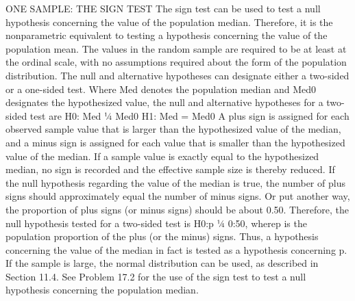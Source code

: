 ONE SAMPLE: THE SIGN TEST
The sign test can be used to test a null hypothesis concerning the value of the population median. Therefore,
it is the nonparametric equivalent to testing a hypothesis concerning the value of the population mean. The
values in the random sample are required to be at least at the ordinal scale, with no assumptions required about
the form of the population distribution.
The null and alternative hypotheses can designate either a two-sided or a one-sided test. Where Med
denotes the population median and Med0 designates the hypothesized value, the null and alternative hypotheses
for a two-sided test are
H0: Med ¼ Med0
H1: Med = Med0
A plus sign is assigned for each observed sample value that is larger than the hypothesized value of the
median, and a minus sign is assigned for each value that is smaller than the hypothesized value of the median. If
a sample value is exactly equal to the hypothesized median, no sign is recorded and the effective sample size is
thereby reduced. If the null hypothesis regarding the value of the median is true, the number of plus signs should
approximately equal the number of minus signs. Or put another way, the proportion of plus signs (or minus
signs) should be about 0.50. Therefore, the null hypothesis tested for a two-sided test is H0:p ¼ 0:50, wherep is
the population proportion of the plus (or the minus) signs. Thus, a hypothesis concerning the value of the
median in fact is tested as a hypothesis concerning p. If the sample is large, the normal distribution can be used,
as described in Section 11.4.
See Problem 17.2 for the use of the sign test to test a null hypothesis concerning the population median.

